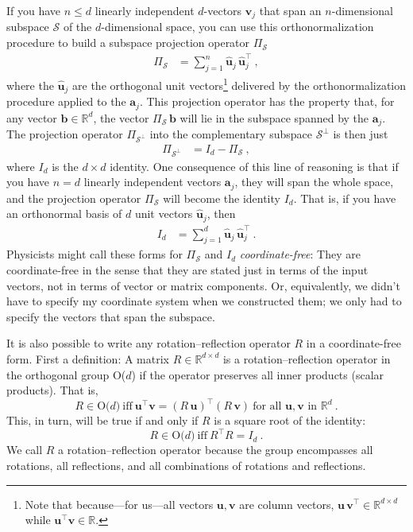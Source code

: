 \documentclass{article}
\newcommand{\proj}{\mathsf{\Pi}}
\newcommand{\Evec}[1]{{\mathbf{#1}}} %
\newcommand{\Ehat}[1]{{\mathbf{\hat{#1}}}} %
\begin{document}
If you have $n\leq d$ linearly independent $d$-vectors $\Evec{v}_j$ that span an $n$-dimensional subspace $\mathscr{S}$ of the $d$-dimensional space, you can use this orthonormalization procedure to build a subspace projection operator $\proj_\mathscr{S}$
\begin{align}\label{eq:oproj}
    \proj_\mathscr{S} &= \sum_{j=1}^n \Ehat{u}_j\,\Ehat{u}_j^\top ~,
\end{align}
where the $\Ehat{u}_j$ are the orthogonal unit vectors\footnote{Note that because---for us---all vectors $\Evec{u},\Evec{v}$ are column vectors, $\Evec{u}\,\Evec{v}^\top\in\mathbb{R}^{d\times d}$ while $\Evec{u}^\top \Evec{v}\in\mathbb{R}$.} delivered by the orthonormalization procedure applied to the $\Evec{a}_j$.
This projection operator has the property that, for any vector $\Evec{b}\in\mathbb{R}^d$, the vector $\proj_\mathscr{S}\,\Evec{b}$ will lie in the subspace spanned by the $\Evec{a}_j$.
The projection operator $\proj_{\mathscr{S}^\perp}$ into the complementary subspace $\mathscr{S}^\perp$ is then just
\begin{align}\label{eq:oprojcomp}
    \proj_{\mathscr{S}^\perp} &= I_d - \proj_\mathscr{S} ~,
\end{align}
where $I_d$ is the $d\times d$ identity.
One consequence of this line of reasoning is that if you have $n=d$ linearly independent vectors $\Evec{a}_j$, they will span the whole space, and the projection operator $\proj_\mathscr{S}$ will become the identity $I_d$.
That is, if you have an orthonormal basis of $d$ unit vectors $\Ehat{u}_j$, then
\begin{align}\label{eq:oI}
    I_d &= \sum_{j=1}^d \Ehat{u}_j\,\Ehat{u}_j^\top ~.
\end{align}
Physicists might call these forms for $\proj_\mathscr{S}$ and $I_d$ \emph{coordinate-free}:
They are coordinate-free in the sense that they are stated just in terms of the input vectors, not in terms of vector or matrix components.
Or, equivalently, we didn't have to specify my coordinate system when we constructed them; we only had to specify the vectors that span the subspace.

It is also possible to write any rotation--reflection operator $R$ in a coordinate-free form.
First a definition: A matrix $R\in\mathbb{R}^{d\times d}$ is a rotation--reflection operator in the orthogonal group O($d$) if the operator preserves all inner products (scalar products).
That is,
\begin{equation}
    R \in \mbox{O($d$)} ~ \mbox{iff} ~ \Evec{u}^\top\Evec{v}=(R\,\Evec{u})^\top(R\,\Evec{v}) ~ \mbox{for all $\Evec{u},\Evec{v}$ in $\mathbb{R}^d$} ~.\label{eq:orth1}
\end{equation}
This, in turn, will be true if and only if $R$ is a square root of the identity:
\begin{equation}
    R \in \mbox{O($d$)} ~ \mbox{iff} ~ R^\top R=I_d ~.\label{eq:orth2}
\end{equation}
We call $R$ a rotation--reflection operator because the group encompasses all rotations, all reflections, and all combinations of rotations and reflections.
\end{document}
